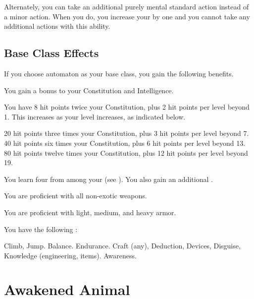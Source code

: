       Alternately, you can take an additional purely mental standard action instead of a minor action.
      When you do, you increase your  by one and you  cannot take any additional actions with this ability.

  \subsection{Base Class Effects}
    If you choose automaton as your base class, you gain the following benefits.

     You gain a  bonus to your Constitution and Intelligence.

      You have 8 hit points \add twice your Constitution, plus 2 hit points per level beyond 1.
      This increases as your level increases, as indicated below.
      \begin{itemize}
         20 hit points \add three times your Constitution, plus 3 hit points per level beyond 7.
         40 hit points \add six times your Constitution, plus 6 hit points per level beyond 13.
         80 hit points \add twelve times your Constitution, plus 12 hit points per level beyond 19.
      \end{itemize}

      You learn four  from among your  (see ). You also gain an additional .

      You are proficient with all non-exotic weapons.

      You are proficient with light, medium, and heavy armor.

      You have the following :
      \begin{itemize}
         Climb, Jump.
         Balance.
         Endurance.
         Craft (any), Deduction, Devices, Disguise, Knowledge (engineering, items).
         Awareness.
      \end{itemize}

\section{Awakened Animal}

